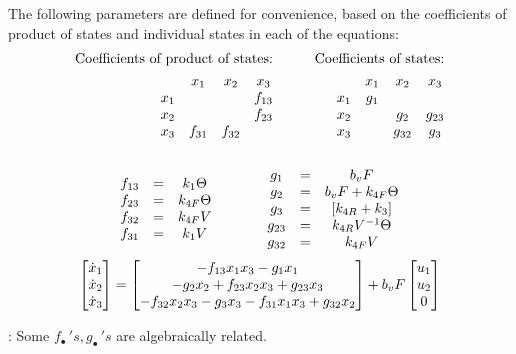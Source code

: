 The following parameters are defined for convenience, based on the coefficients
of product of states and individual states in each of the equations:
\begin{align*}
    \text{Coefficients of product of states:} &\qquad& \text{Coefficients of states:}\\
    \begin{matrix}    & x_1    & x_2      & x_3    \\
        x_1 &        &          & f_{13} \\
        x_2 &        &          & f_{23} \\
        x_3 & f_{31} & f_{32}   & \end{matrix}
    &\qquad &
    \begin{matrix}     & x_1    & x_2      & x_3    \\
        x_1  & g_1    &          &        \\
        x_2  &        & g_{2}    & g_{23} \\
        x_3  &        & g_{32}   & g_{3} \end{matrix}
\end{align*}
\begin{align*}
    \begin{matrix} 
    \\f_{13} &=& k_1 \Theta
    \\f_{23} &=& k_{4F} \Theta
    \\f_{32} &=& k_{4F} V
    \\f_{31} &=& k_1 V
     \end{matrix}
    \qquad \qquad
    \begin{matrix} 
    \\ g_1    &=& b_v F
    \\ g_2    &=& b_v F + k_{4F} \Theta
    \\ g_{3}  &=& [k_{4R}+k_3]
    \\ g_{23} &=& k_{4R} V^{-1} \Theta
    \\ g_{32} &=& k_{4F} V
     \end{matrix}
\end{align*}
\begin{equation}\label{eqn::parm_model_theta}
     \begin{bmatrix} \dot x_1 \\
        \dot x_2\\
        \dot x_3\\
         \end{bmatrix} =
    \begin{bmatrix} 
        -f_{13} x_1 x_3
        -g_1 x_1
        \\
        -g_2 x_2
        + f_{23} x_2 x_3
        + g_{23} x_3
        \\
        -f_{32} x_2 x_3
        -g_3 x_3
        -f_{31} x_1 x_3
        + g_{32} x_2
     \end{bmatrix}
    + b_v F \begin{bmatrix} u_1 \\ u_2 \\ 0 \end{bmatrix}
\end{equation}

: Some $f_{\bullet}\,'s, g_{\bullet}\,'s$ are algebraically related.
